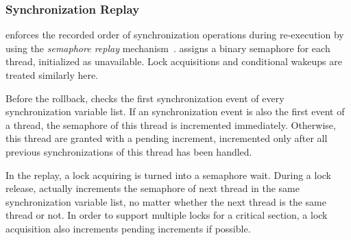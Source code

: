 \subsubsection{Synchronization Replay}
\doubletake{} enforces the recorded order of synchronization operations during re-execution by using the {\it semaphore replay} mechanism~\cite{TERN}. \doubletake{} assigns a binary semaphore for each thread, initialized as unavailable. Lock acquisitions and conditional wakeups are treated similarly here.

Before the rollback, \doubletake{} checks the first synchronization event of every synchronization variable list. If an synchronization event is also the first event of a thread, the semaphore of this thread is incremented immediately. Otherwise, this thread are granted with a pending increment, incremented only after all previous synchronizations of this thread has been  handled.

In the replay, a lock acquiring is turned into a semaphore wait. During a lock release, \doubletake{} actually increments  the semaphore of next thread in the same synchronization variable list, no matter whether the next thread is the same thread or not. In order to support multiple locks for a critical section, a lock acquisition also increments pending increments if possible.


